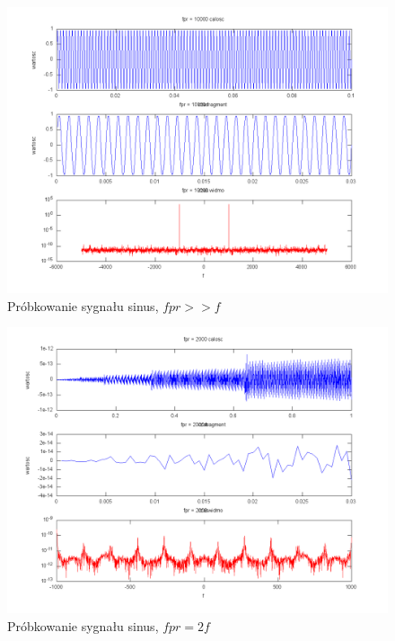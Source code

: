 \documentclass[wide,a4paper,titlepage,12pt]{mwart}
\begin{document}
	\begin{landscape}
	  \begin{figure}[htbp]
	    \begin{center}
	      \includegraphics[scale=.5]{out/prob1.png}
	      \caption{\label{prob1} Próbkowanie sygnału sinus, $fpr >> f$}
	    \end{center}
	  \end{figure}
	\end{landscape}

	\begin{landscape}
	  \begin{figure}[htbp]
	    \begin{center}
	      \includegraphics[scale=.5]{out/prob2.png}
	      \caption{\label{prob2} Próbkowanie sygnału sinus, $fpr = 2f$}
	    \end{center}
	  \end{figure}
	\end{landscape}
\end{document}
